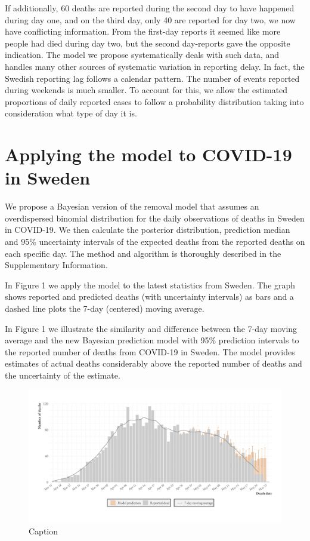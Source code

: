 \documentclass[a4paper,11pt,article,oneside,openany,american]{memoir}
\begin{document}
If additionally, 60 deaths are reported during the second day to have happened during day one, and on the third day, only 40 are reported for day two, we now have conflicting information. From the first-day reports it seemed like more people had died during day two, but the second day-reports gave the opposite indication. The model we propose systematically deals with such data, and handles many other sources of systematic variation in reporting delay. In fact, the Swedish reporting lag follows a calendar pattern. The number of events reported during weekends is much smaller. To account for this, we allow the estimated proportions of daily reported cases to follow a probability distribution taking into consideration what type of day it is.

\chapter{Applying the model to COVID-19 in Sweden}
We propose a Bayesian version of the removal model that assumes an overdispersed binomial distribution for the daily observations of deaths in Sweden in COVID-19. We then calculate the posterior distribution, prediction median and 95\% uncertainty intervals of the expected deaths from the reported deaths on each specific day. The method and algorithm is thoroughly described in the Supplementary Information.

In Figure 1 we apply the model to the latest statistics from Sweden. The graph shows reported and predicted deaths (with uncertainty intervals) as bars and a dashed line plots the 7-day (centered) moving average.

In Figure 1 we illustrate the similarity and difference between the 7-day moving average and the new Bayesian prediction model with 95\% prediction intervals to the reported number of deaths from COVID-19 in Sweden. The model provides estimates of actual deaths considerably above the reported number of deaths and the uncertainty of the estimate.

\begin{figure}
    \centering
    \includegraphics[height=0.8\textwidth,keepaspectratio]{../plots/latest_prediction}
    \caption{Caption}
    \label{fig:latest_prediction}
\end{figure}
\end{document}
